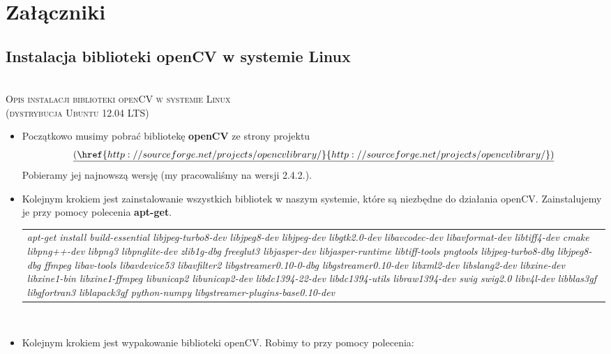 
\section{Załączniki}
\subsection{Instalacja biblioteki openCV w systemie Linux}
\begin{center}
\HRule \\[0.4cm]
\textsc{\Large Opis instalacji biblioteki openCV w systemie Linux\\ (dystrybucja Ubuntu 12.04 LTS)}
\HRule \\[0.4cm]
\end{center}

\begin{itemize}
\item Początkowo musimy pobrać bibliotekę \textbf{openCV} ze strony projektu 
\[
\underline{(\href{http://sourceforge.net/projects/opencvlibrary/}{http://sourceforge.net/projects/opencvlibrary/})}
\]
 Pobieramy jej najnowszą wersję (my pracowaliśmy na wersji 2.4.2.).\\

\item Kolejnym krokiem jest zainstalowanie wszystkich bibliotek w naszym systemie, które są niezbędne do działania openCV. Zainstalujemy je przy pomocy polecenia \textbf{apt-get}. \\  

\begin{tabular}{p{15cm}}
 \textit{
apt-get install build-essential libjpeg-turbo8-dev libjpeg8-dev libjpeg-dev libgtk2.0-dev libavcodec-dev libavformat-dev libtiff4-dev cmake libpng++-dev libpng3
libpnglite-dev
zlib1g-dbg
freeglut3 libjasper-dev libjasper-runtime
libtiff-tools pngtools
libjpeg-turbo8-dbg libjpeg8-dbg
ffmpeg libav-tools libavdevice53 libavfilter2
libgstreamer0.10-0-dbg libgstreamer0.10-dev libxml2-dev
libslang2-dev libxine-dev libxine1-bin libxine1-ffmpeg
libunicap2 libunicap2-dev
libdc1394-22-dev libdc1394-utils libraw1394-dev
swig swig2.0
 libv4l-dev
libblas3gf libgfortran3 liblapack3gf python-numpy
libgstreamer-plugins-base0.10-dev}\\

\end{tabular} \\ 



\item Kolejnym krokiem jest wypakowanie biblioteki openCV. Robimy to przy pomocy polecenia: 


\end{itemize}
